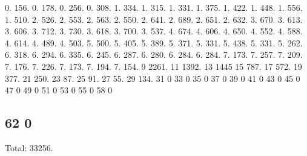 0. 156. 0. 178. 0. 256. 0. 308. 1. 334. 1. 315. 1. 331. 1. 375. 1. 422. 1. 448. 1. 556. 1. 510. 2. 526. 2. 553. 2. 563. 2. 550. 2. 641. 2. 689. 2. 651. 2. 632. 3. 670. 3. 613. 3. 606. 3. 712. 3. 730. 3. 618. 3. 700. 3. 537. 4. 674. 4. 606. 4. 650. 4. 552. 4. 588. 4. 614. 4. 489. 4. 503. 5. 500. 5. 405. 5. 389. 5. 371. 5. 331. 5. 438. 5. 331. 5. 262. 6. 318. 6. 294. 6. 335. 6. 245. 6. 287. 6. 280. 6. 284. 6. 284. 7. 173. 7. 257. 7. 209. 7. 176. 7. 226. 7. 173. 7. 194. 7. 154. 9 2261. 11 1392. 13 1445 15 787. 17 572. 19 377. 21 250. 23 87. 25 91. 27 55. 29 134. 31 0 33 0 35 0 37 0 39 0 41 0 43 0 45 0 47 0 49 0 51 0 53 0 55 0 58 0 \subsection*{62 0 }

Total\+: 33256. 